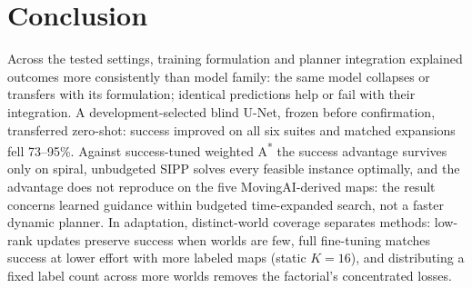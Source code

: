 \documentclass[letterpaper]{article} %
\begin{document}
\section{Conclusion}

Across the tested settings, training formulation and planner integration explained outcomes more consistently than model family: the same model collapses or transfers with its formulation; identical predictions help or fail with their integration. A development-selected blind U-Net, frozen before confirmation, transferred zero-shot: success improved on all six suites and matched expansions fell 73--95\%. Against success-tuned weighted A\textsuperscript{*} the success advantage survives only on spiral, unbudgeted SIPP solves every feasible instance optimally, and the advantage does not reproduce on the five MovingAI-derived maps: the result concerns learned guidance within budgeted time-expanded search, not a faster dynamic planner. In adaptation, distinct-world coverage separates methods: low-rank updates preserve success when worlds are few, full fine-tuning matches success at lower effort with more labeled maps (static $K{=}16$), and distributing a fixed label count across more worlds removes the factorial's concentrated losses.



\end{document}
